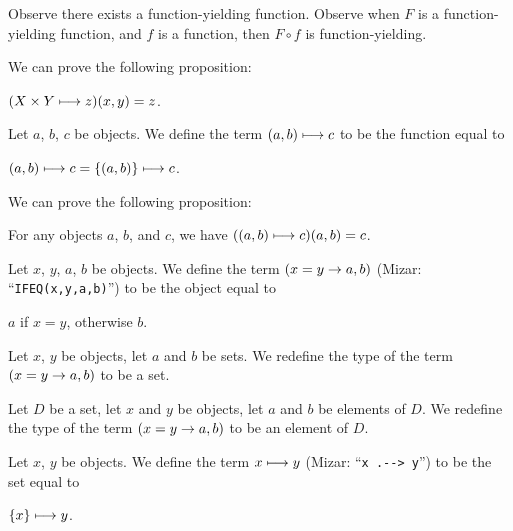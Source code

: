 \documentclass{article}
\begin{document}
Observe there exists a function-yielding function.
Observe when $F$ is a function-yielding function, and $f$ is a function,
then $F\circ f$ is function-yielding.

We can prove the following proposition:
\begin{thm}
\item\label{funcop1:70} $(X\times Y\longmapsto z)(x,y)=z$.
\end{thm}

\begin{definition}
Let $a$, $b$, $c$ be objects.
We define the term $(a,b)\longmapsto c$ to be the function equal to
\begin{defn}
\item $(a,b)\longmapsto c = \{(a,b)\}\longmapsto c$.
\end{defn}
\end{definition}

We can prove the following proposition:
\begin{thm}
\item\label{funcop1:71} For any objects $a$, $b$, and $c$, we have
  $((a,b)\longmapsto c)(a,b)=c$.
\end{thm}

\begin{definition}
Let $x$, $y$, $a$, $b$ be objects.
We define the term $(x=y \to a,b)$ (Mizar: ``\verb#IFEQ(x,y,a,b)#'')
to be the object equal to
\begin{defn}
\item $a$ if $x=y$, otherwise $b$.
\end{defn}
\end{definition}

\begin{definition}
Let $x$, $y$ be objects, let $a$ and $b$ be sets.
We redefine the type of the term $(x=y \to a,b)$ to be a set.
\end{definition}

\begin{definition}
Let $D$ be a set, let $x$ and $y$ be objects, let $a$ and $b$ be
elements of $D$.
We redefine the type of the term $(x=y \to a,b)$ to be an element of
$D$.
\end{definition}

\begin{definition}
Let $x$, $y$ be objects.
We define the term $x\longmapsto y$ (Mizar: ``\verb#x .--> y#'')
to be the set equal to
\begin{defn}
\item $\{x\}\longmapsto y$.
\end{defn}
\end{definition}
\end{document}
